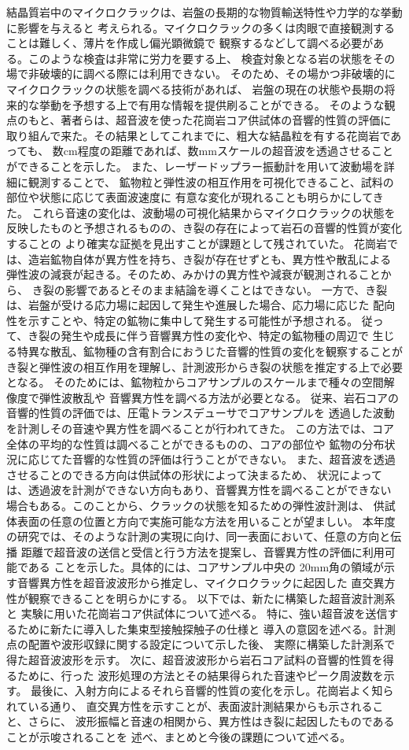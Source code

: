 結晶質岩中のマイクロクラックは、岩盤の長期的な物質輸送特性や力学的な挙動に影響を与えると
考えられる。マイクロクラックの多くは肉眼で直接観測することは難しく、薄片を作成し偏光顕微鏡で
観察するなどして調べる必要がある。このような検査は非常に労力を要する上、
検査対象となる岩の状態をその場で非破壊的に調べる際には利用できない。
そのため、その場かつ非破壊的にマイクロクラックの状態を調べる技術があれば、
岩盤の現在の状態や長期の将来的な挙動を予想する上で有用な情報を提供刷ることができる。
そのような観点のもと、著者らは、超音波を使った花崗岩コア供試体の音響的性質の評価に
取り組んで来た。その結果としてこれまでに、粗大な結晶粒を有する花崗岩であっても、
数cm程度の距離であれば、数mmスケールの超音波を透過させることができることを示した。
また、レーザードップラー振動計を用いて波動場を詳細に観測することで、
鉱物粒と弾性波の相互作用を可視化できること、試料の部位や状態に応じて表面波速度に
有意な変化が現れることも明らかにしてきた。
これら音速の変化は、波動場の可視化結果からマイクロクラックの状態を
反映したものと予想されるものの、き裂の存在によって岩石の音響的性質が変化することの
より確実な証拠を見出すことが課題として残されていた。
花崗岩では、造岩鉱物自体が異方性を持ち、き裂が存在せずとも、異方性や散乱による
弾性波の減衰が起きる。そのため、みかけの異方性や減衰が観測されることから、
き裂の影響であるとそのまま結論を導くことはできない。
一方で、き裂は、岩盤が受ける応力場に起因して発生や進展した場合、応力場に応じた
配向性を示すことや、特定の鉱物に集中して発生する可能性が予想される。
従って、き裂の発生や成長に伴う音響異方性の変化や、特定の鉱物種の周辺で
生じる特異な散乱、鉱物種の含有割合におうじた音響的性質の変化を観察することが
き裂と弾性波の相互作用を理解し、計測波形からき裂の状態を推定する上で必要となる。
そのためには、鉱物粒からコアサンプルのスケールまで種々の空間解像度で弾性波散乱や
音響異方性を調べる方法が必要となる。
従来、岩石コアの音響的性質の評価では、圧電トランスデューサでコアサンプルを
透過した波動を計測しその音速や異方性を調べることが行われてきた。
この方法では、コア全体の平均的な性質は調べることができるものの、コアの部位や
鉱物の分布状況に応じてた音響的な性質の評価は行うことができない。
また、超音波を透過させることのできる方向は供試体の形状によって決まるため、
状況によっては、透過波を計測ができない方向もあり、音響異方性を調べることができない
場合もある。このことから、クラックの状態を知るための弾性波計測は、
供試体表面の任意の位置と方向で実施可能な方法を用いることが望ましい。
本年度の研究では、そのような計測の実現に向け、同一表面において、任意の方向と伝播
距離で超音波の送信と受信と行う方法を提案し、音響異方性の評価に利用可能である
ことを示した。具体的には、コアサンプル中央の
20mm角の領域が示す音響異方性を超音波波形から推定し、マイクロクラックに起因した
直交異方性が観察できることを明らかにする。
以下では、新たに構築した超音波計測系と 実験に用いた花崗岩コア供試体について述べる。
特に、強い超音波を送信するために新たに導入した集束型接触探触子の仕様と
導入の意図を述べる。計測点の配置や波形収録に関する設定について示した後、
実際に構築した計測系で得た超音波波形を示す。
次に、超音波波形から岩石コア試料の音響的性質を得るために、行った
波形処理の方法とその結果得られた音速やピーク周波数を示す。
最後に、入射方向によるそれら音響的性質の変化を示し。花崗岩よく知られている通り、
直交異方性を示すことが、表面波計測結果からも示されること、さらに、
波形振幅と音速の相関から、異方性はき裂に起因したものであることが示唆されることを
述べ、まとめと今後の課題について述べる。
